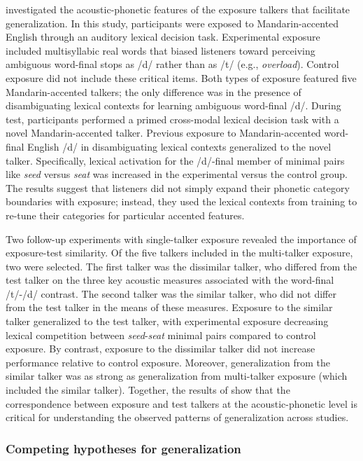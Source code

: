 \documentclass[preprint, 3p, authoryear]{elsarticle} %
\begin{document}
\citet{xie2017similarity} investigated the acoustic-phonetic features of the exposure talkers that facilitate generalization.
In this study, participants were exposed to Mandarin-accented English through an auditory lexical decision task.
Experimental exposure included multisyllabic real words that biased listeners toward perceiving ambiguous word-final stops as /d/ rather than as /t/ (e.g., \emph{overload}).
Control exposure did not include these critical items.
Both types of exposure featured five Mandarin-accented talkers; the only difference was in the presence of disambiguating lexical contexts for learning ambiguous word-final /d/.
During test, participants performed a primed cross-modal lexical decision task with a novel Mandarin-accented talker.
Previous exposure to Mandarin-accented word-final English /d/ in disambiguating lexical contexts generalized to the novel talker.
Specifically, lexical activation for the /d/-final member of minimal pairs like \emph{seed} versus \emph{seat} was increased in the experimental versus the control group.
The results suggest that listeners did not simply expand their phonetic category boundaries with exposure; instead, they used the lexical contexts from training to re-tune their categories for particular accented features.

Two follow-up experiments with single-talker exposure revealed the importance of exposure-test similarity.
Of the five talkers included in the multi-talker exposure, two were selected.
The first talker was the dissimilar talker, who differed from the test talker on the three key acoustic measures associated with the word-final /t/-/d/ contrast.
The second talker was the similar talker, who did not differ from the test talker in the means of these measures.
Exposure to the similar talker generalized to the test talker, with experimental exposure decreasing lexical competition between \emph{seed}-\emph{seat} minimal pairs compared to control exposure.
By contrast, exposure to the dissimilar talker did not increase performance relative to control exposure.
Moreover, generalization from the similar talker was as strong as generalization from multi-talker exposure (which included the similar talker).
Together, the results of \citet{xie2017similarity} show that the correspondence between exposure and test talkers at the acoustic-phonetic level is critical for understanding the observed patterns of generalization across studies.

\hypertarget{competing-hypotheses-for-generalization}{%
\subsubsection{Competing hypotheses for generalization}\label{competing-hypotheses-for-generalization}}
\end{document}
